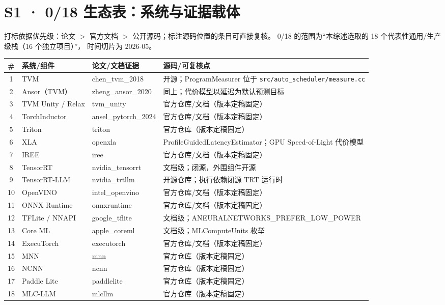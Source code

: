 \documentclass[11pt,a4paper]{article}
\begin{document}
\section{S1 · 0/18 生态表：系统与证据载体}
打标依据优先级：论文 $>$ 官方文档 $>$ 公开源码；标注源码位置的条目可直接复核。
0/18 的范围为“本综述选取的 18 个代表性通用/生产级栈（16 个独立项目）”，
时间切片为 2026-05。

{\scriptsize
\begin{tabularx}{\textwidth}{@{}clXX@{}}
\toprule
\# & 系统/组件 & 论文/文档证据 & 源码/可复核点 \\
\midrule
1 & TVM & chen\_tvm\_2018 & 开源；ProgramMeasurer 位于 \texttt{src/auto\_scheduler/measure.cc} \\
2 & Ansor（TVM） & zheng\_ansor\_2020 & 同上；代价模型以延迟为默认预测目标 \\
3 & TVM Unity / Relax & tvm\_unity & 官方仓库/文档（版本定稿固定） \\
4 & TorchInductor & ansel\_pytorch\_2024 & 官方仓库/文档（版本定稿固定） \\
5 & Triton & triton & 官方仓库（版本定稿固定） \\
6 & XLA & openxla & ProfileGuidedLatencyEstimator；GPU Speed-of-Light 代价模型 \\
7 & IREE & iree & 官方仓库/文档（版本定稿固定） \\
8 & TensorRT & nvidia\_tensorrt & 文档级；闭源，外围组件开源 \\
9 & TensorRT-LLM & nvidia\_trtllm & 开源仓库；执行依赖闭源 TRT 运行时 \\
10 & OpenVINO & intel\_openvino & 官方仓库/文档（版本定稿固定） \\
11 & ONNX Runtime & onnxruntime & 官方仓库/文档（版本定稿固定） \\
12 & TFLite / NNAPI & google\_tflite & 文档级；ANEURALNETWORKS\_PREFER\_LOW\_POWER \\
13 & Core ML & apple\_coreml & 文档级；MLComputeUnits 枚举 \\
14 & ExecuTorch & executorch & 官方仓库/文档（版本定稿固定） \\
15 & MNN & mnn & 官方仓库（版本定稿固定） \\
16 & NCNN & ncnn & 官方仓库（版本定稿固定） \\
17 & Paddle Lite & paddlelite & 官方仓库（版本定稿固定） \\
18 & MLC-LLM & mlcllm & 官方仓库（版本定稿固定） \\
\bottomrule
\end{tabularx}}
\end{document}
